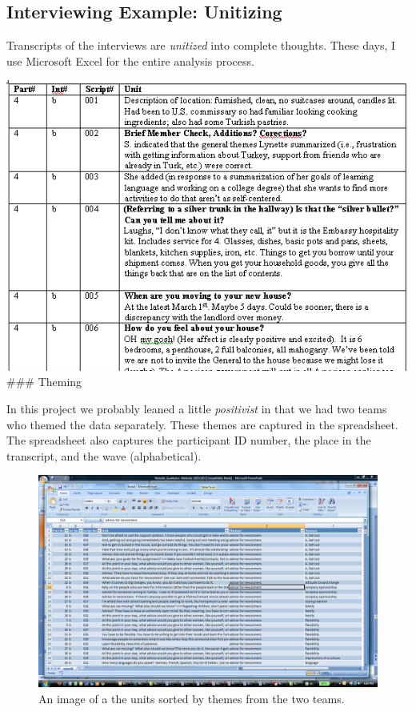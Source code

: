 \documentclass[
  english,
]{book}
\begin{document}
\hypertarget{interviewing-example-unitizing}{%
\subsection{Interviewing Example: Unitizing}\label{interviewing-example-unitizing}}

Transcripts of the interviews are \emph{unitized} into complete thoughts. These days, I use Microsoft Excel for the entire analysis process.

\includegraphics{images/Qualitative/unitizing.png}
\#\#\# Theming

In this project we probably leaned a little \emph{positivist} in that we had two teams who themed the data separately. These themes are captured in the spreadsheet. The spreadsheet also captures the participant ID number, the place in the transcript, and the wave (alphabetical).

\begin{figure}
\centering
\includegraphics{images/Qualitative/theming.png}
\caption{An image of a the units sorted by themes from the two teams.}
\end{figure}
\end{document}
